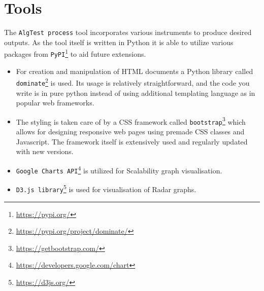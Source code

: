 \section{Tools}
The \texttt{AlgTest process} tool incorporates various instruments to produce desired outputs. As the tool itself is written in Python it is able to utilize various packages from \texttt{PyPI}\footnote{\url{https://pypi.org/}} to aid future extensions.

\begin{itemize}
    \item For creation and manipulation of HTML documents a Python library called \texttt{dominate}\footnote{\url{https://pypi.org/project/dominate/}} is used. Its usage is relatively straightforward, and the code you write is in pure python instead of using additional templating language as in popular web frameworks.
    \item The styling is taken care of by a CSS framework called \texttt{bootstrap}\footnote{\url{https://getbootstrap.com/}} which allows for designing responsive web pages using premade CSS classes and Javascript. The framework itself is extensively used and regularly updated with new versions.
    \item \texttt{Google Charts API}\footnote{\url{https://developers.google.com/chart}}  is utilized for Scalability graph visualisation.
    \item \texttt{D3.js library}\footnote{\url{https://d3js.org/}}  is used for visualisation of Radar graphs.
\end{itemize}

